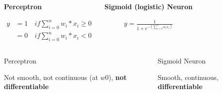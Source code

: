 \begin{frame}
	\begin{columns}
		\begin{overlayarea}{\textwidth}{\textheight}
			\vspace{+0.2in}
			\begin{center}
				\textbf{Perceptron}
				
			\end{center}
			\vspace{-0.2in}
			\begin{align*}
				y & =1 \quad if \sum^{n}_{i=0} w_i * x_i \geq 0 \\
				  & =0  \quad if \sum^{n}_{i=0} w_i * x_i < 0
			\end{align*}
		\end{overlayarea}
		\begin{overlayarea}{\textwidth}{\textheight}
			\vspace{+0.2in}
			\begin{center}
				\textbf{Sigmoid (logistic) Neuron}
				
			\end{center}
			\vspace{-0.2in}
			\begin{align*}
				y = \frac{1}{1 + e^{-(\sum_{i=0}^{n} w_i x_i)}}
			\end{align*}
		\end{overlayarea}
	\end{columns}
\end{frame}

\begin{frame}
	\begin{columns}
		\column{0.5\textwidth}
		\begin{overlayarea}{\textwidth}{\textheight}
			\begin{center}
				Perceptron
				
				Not smooth, not continuous (at $w0$), \textbf{not differentiable}
			\end{center}
		\end{overlayarea}

		\column{0.6\textwidth}
		\begin{overlayarea}{\textwidth}{\textheight}
			\begin{center}
				Sigmoid Neuron
				
				Smooth, continuous, \textbf{differentiable}

			\end{center}
		\end{overlayarea}
	\end{columns}
\end{frame}
